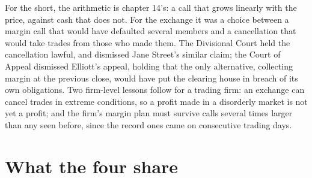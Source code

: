 \begin{omfigure}
\par
{}\label{fig:fm:case-studies-ii:nickel}
\end{omfigure}

For the short, the arithmetic is chapter 14's: a call that grows linearly with the price, against cash that does not. For the exchange it was a
choice between a margin call that would have defaulted several members and a cancellation that would take trades from those who made them. The
Divisional Court held the cancellation lawful, and dismissed Jane Street's similar claim; the Court of Appeal dismissed Elliott's appeal, holding that
the only alternative, collecting margin at the previous close, would have put the clearing house in breach of its own obligations. Two firm-level
lessons follow for a trading firm: an exchange can cancel trades in extreme conditions, so a profit made in a disorderly market is not yet a profit;
and the firm's margin plan must survive calls several times larger than any seen before, since the record ones came on consecutive trading days.

\section{What the four share}

